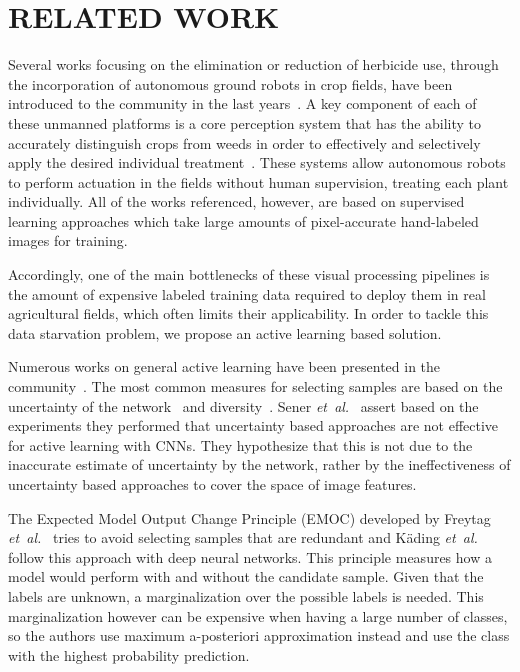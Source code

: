\documentclass[letterpaper, 10 pt, conference]{ieeeconf}  %
\newcommand\etal{\emph{et~al.}}
\begin{document}
\section{RELATED WORK}
\label{sec:related}



Several works focusing on the elimination or reduction of herbicide use,
through the incorporation of autonomous ground robots in crop fields, have
been introduced to the community in the last years~\cite{ducket2018arxiv,liebisch2016wslw,mccool2018ral}.
A key component of each of these unmanned platforms is a core perception system that
has the ability to accurately distinguish crops from weeds in order to effectively
and selectively apply the desired individual treatment~\cite{lottes2018iros, mccool2017ral,milioto2017uavg,milioto2018real,sa2018rs}.
These systems allow autonomous robots to perform actuation in the fields without human supervision, treating each plant individually.
All of the works referenced, however, are based on supervised learning approaches which take large amounts of pixel-accurate hand-labeled images for training. 

Accordingly, one of the main bottlenecks of these visual processing pipelines is the amount of expensive labeled training data required to deploy them in real agricultural fields, which often limits their applicability. In order to tackle this data starvation problem, we propose an active learning based solution.

Numerous works on general active learning have been presented in the community~\cite{settles2009active,guyon2011results,holub2008entropy, yoo2019learning}. The most common measures for selecting samples are based on the uncertainty of the network~\cite{zhou2017fine, yang2017suggestive, gal2017deep, wang2017cost} and diversity~\cite{zhou2017fine, dutt2016active, kading2016active}.  Sener \etal~\cite{sener2017geometric} assert based on the experiments they performed that uncertainty based approaches are not effective for active learning with CNNs. They hypothesize that this is not due to the inaccurate estimate of uncertainty by the network, rather by the ineffectiveness of uncertainty based approaches to cover the space of image features.

The Expected Model Output Change Principle (EMOC) developed by Freytag \etal~\cite{freytag2014selecting} tries to avoid selecting samples that are redundant and K{\"a}ding \etal~\cite{kading2016active} follow this approach with deep neural networks. This principle measures how a model would perform with and without the candidate sample. Given that the labels are unknown, a marginalization over the possible labels is needed. This marginalization however can be expensive when having a large number of classes, so the authors use maximum a-posteriori approximation instead and use the class with the highest probability prediction.
\end{document}
